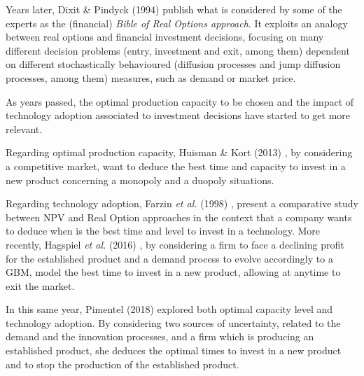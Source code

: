 Years later, Dixit \& Pindyck (1994) \cite{dixit:book} publish what is considered by some of the experts as the (financial) \textit{Bible of Real Options approach}. It exploits an analogy between real options and financial investment decisions, focusing on many different decision problems (entry, investment and exit, among them) dependent on different stochastically behavioured (diffusion processes and jump diffusion processes, among them) measures, such as demand or market price.


As years passed, the optimal production capacity to be chosen and the impact of technology adoption associated to investment decisions have started to get more relevant.

Regarding optimal production capacity, Huisman \& Kort (2013) \cite{huis:cap}, by considering a competitive market, want to deduce the best time and capacity to invest in a new product concerning a monopoly and a duopoly situations.

Regarding technology adoption,
Farzin \textit{et al.} (1998) \cite{farzin:cap}, present a comparative study between NPV and Real Option approaches in the context that a company wants to deduce when is the best time and level to invest in a technology.
More recently, Hagspiel \textit{et al.} (2016) \cite{hagspiel:cap}, by considering a firm  to face a declining profit for the established product and a demand process to evolve accordingly to a GBM, model the best time to invest in a new product, allowing at anytime to exit the market. %

In this same year, Pimentel (2018) \cite{rita} explored both optimal capacity level and technology adoption. By considering two sources of uncertainty, related to the demand and the innovation processes,
and a firm which is producing an established product, she deduces the optimal times to invest in a new product and to stop the production of the established product. 



